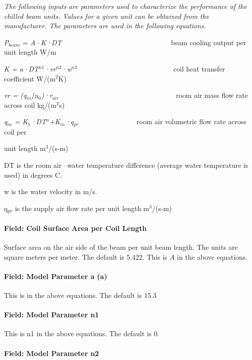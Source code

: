\emph{The following inputs are parameters used to characterize the performance of the chilled beam units. Values for a given unit can be obtained from the manufacturer. The parameters are used in the following equations.~~~~~}

\emph{P\(_{beam}\)} = \emph{A·K·DT~~~~~~~} ~~~~~~~~~~~~~~~~~~~~~~~ beam cooling output per unit length W/m

\emph{K = a·DT\(^{n1}\)·vr\(^{n2}\)·w\(^{n3}\)}~~~~~~~~~~~~~~~~~~~~~~~~~~~ coil heat transfer coefficient W/(m\(^{2}\)K)

\emph{vr = (q\(_{in}\)}/a\emph{\(_{0}\))·r\(_{air}\)}~~~~~~~~~~~~~~~~~~~~~~~~~~~~~~~~~ room air mass flow rate across coil kg/(m\(^{2}\)s)

\emph{q\(_{in}\) = K\(_{1}\)·DT\(^{n}\)+K\(_{in}\)·q\(_{pr}\)}~~~~~~~~~~~~~~~~ room air volumetric flow rate across coil per

unit length m\(^{3}\)/(s-m)

DT is the room air --water temperature difference (average water temperature is used) in degrees C.

w is the water velocity in m/s.

q\(_{pr}\) is the supply air flow rate per unit length m\(^{3}\)/(s-m)

\paragraph{Field: Coil Surface Area per Coil Length}\label{field-coil-surface-area-per-coil-length}

Surface area on the air side of the beam per unit beam length. The units are square meters per meter. The default is 5.422. This is \emph{A} in the above equations.

\paragraph{Field: Model Parameter a (a)}\label{field-model-parameter-a-a}

This is in the above equations. The default is 15.3

\paragraph{Field: Model Parameter n1}\label{field-model-parameter-n1}

This is n1 in the above equations. The default is 0.

\paragraph{Field: Model Parameter n2}\label{field-model-parameter-n2}

